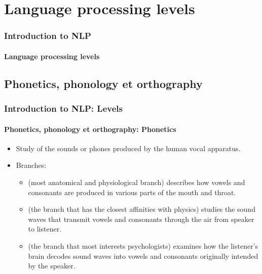 \documentclass[xcolor=table]{beamer}
\begin{document}
\section{Language processing levels}

\begin{frame}
\frametitle{Introduction to NLP}
\framesubtitle{Language processing levels}

\begin{center}
\end{center}

\end{frame}

\subsection{Phonetics, phonology et orthography}

\begin{frame}
\frametitle{Introduction to NLP: Levels}
\framesubtitle{Phonetics, phonology et orthography: Phonetics}

\begin{itemize}
	\item Study of the sounds or phones produced by the human vocal apparatus.
	\item Branches:
	\begin{itemize}
		\item {} (most anatomical and physiological branch) describes how vowels and consonants are produced in various parts of the mouth and throat.
		\item {} (the branch that has the closest affinities with physics) studies the sound waves that transmit vowels and consonants through the air from speaker to listener.
		\item {} (the branch that most interests psychologists) examines how the listener's brain decodes sound waves into vowels and consonants originally intended by the speaker.
	\end{itemize}
\end{itemize}

\end{frame}
\end{document}
